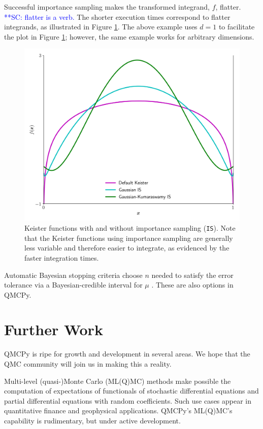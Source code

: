 \documentclass[graybox,footinfo]{svmult}
\newcommand{\scnote}[1]{ {\textcolor{blue}  {\mbox{**SC:} #1}}}
\begin{document}
Successful importance sampling makes the transformed integrand, $f$, flatter. \scnote{flatter is a verb.} The shorter execution times correspond to flatter integrands, as  illustrated in Figure \ref{fig:mIS}. The above example uses $d=1$ to facilitate the plot in Figure \ref{fig:mIS}; however, the same example works for arbitrary dimensions.
\begin{figure}[t]
    \centering
	\includegraphics[width=.8\textwidth]{QMCSoftwareArticle/figs/multiple_IS.png}
	\caption{Keister functions with and without importance sampling (\texttt{IS}). Note that the Keister functions using importance sampling are generally less variable and therefore easier to integrate, as evidenced by the faster integration times.} \label{fig:mIS}
\end{figure}

Automatic Bayesian stopping criteria choose $n$ needed to satisfy the error tolerance via a Bayesian-credible interval for $\mu$ \cite{RatHic19a,JagHic22a}.  These are also options in QMCPy.


\section{Further Work} \label{sec:further}

QMCPy is ripe for growth and development in several areas.  We hope that the QMC community will join us in making this a reality.

Multi-level (quasi-)Monte Carlo (ML(Q)MC) methods make possible the computation of expectations of functionals of stochastic differential equations and partial differential equations with random coefficients.  Such use cases appear in quantitative finance and geophysical applications.  QMCPy's ML(Q)MC's capability is rudimentary, but under active development.
\end{document}
